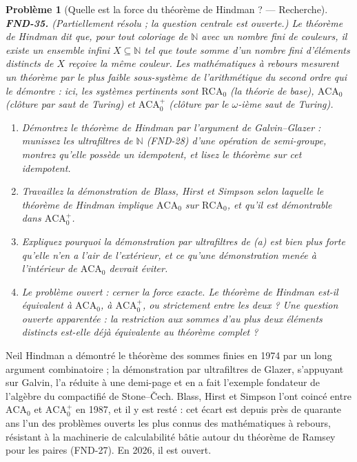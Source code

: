 \documentclass[11pt]{article}
\newtheorem{problem}{Problème}
\begin{document}
\bigskip

\begin{problem}[{Quelle est la force du théorème de Hindman ? --- Recherche}]
\textbf{FND-35.} (Partiellement résolu ; la question centrale est ouverte.) Le théorème de
Hindman dit que, pour tout coloriage de $\mathbb{N}$ avec un nombre fini de couleurs, il existe un ensemble
infini $ X \subseteq \mathbb{N} $ tel que toute somme d'un nombre fini d'éléments distincts de
$ X $ reçoive la même couleur. Les mathématiques à rebours mesurent un théorème par le plus
faible sous-système de l'arithmétique du second ordre qui le démontre : ici, les systèmes
pertinents sont $ \mathrm{RCA}_0 $ (la théorie de base), $ \mathrm{ACA}_0 $ (clôture par saut
de Turing) et $ \mathrm{ACA}_0^{+} $ (clôture par le $ \omega $-ième saut de Turing).
\begin{enumerate}
\item[(a)] Démontrez le théorème de Hindman par l'argument de Galvin--Glazer : munissez les ultrafiltres
de $\mathbb{N}$ (FND-28) d'une opération de semi-groupe, montrez qu'elle possède un idempotent, et lisez le
théorème sur cet idempotent.
\item[(b)] Travaillez la démonstration de Blass, Hirst et Simpson selon laquelle le théorème de Hindman
implique $ \mathrm{ACA}_0 $ sur $ \mathrm{RCA}_0 $, et qu'il est démontrable dans
$ \mathrm{ACA}_0^{+} $.
\item[(c)] Expliquez pourquoi la démonstration par ultrafiltres de (a) est bien plus forte qu'elle n'en a
l'air de l'extérieur, et ce qu'une démonstration menée à l'intérieur de $ \mathrm{ACA}_0 $
devrait éviter.
\item[(d)] Le problème ouvert : cerner la force exacte. Le théorème de Hindman est-il équivalent à
$ \mathrm{ACA}_0 $, à $ \mathrm{ACA}_0^{+} $, ou strictement entre les deux ? Une question
ouverte apparentée : la restriction aux sommes d'au plus deux éléments distincts est-elle déjà
équivalente au théorème complet ?
\end{enumerate}

\end{problem}

\noindent Neil Hindman a démontré le théorème des sommes finies en 1974 par un long
argument combinatoire ; la démonstration par ultrafiltres de Glazer, s'appuyant sur Galvin, l'a
réduite à une demi-page et en a fait l'exemple fondateur de l'algèbre du compactifié de
Stone--\v{C}ech. Blass, Hirst et Simpson l'ont coincé entre $ \mathrm{ACA}_0 $ et
$ \mathrm{ACA}_0^{+} $ en 1987, et il y est resté : cet écart est depuis près de quarante ans
l'un des problèmes ouverts les plus connus des mathématiques à rebours, résistant à la machinerie
de calculabilité bâtie autour du théorème de Ramsey pour les paires (FND-27). En 2026, il est
ouvert.
\end{document}
